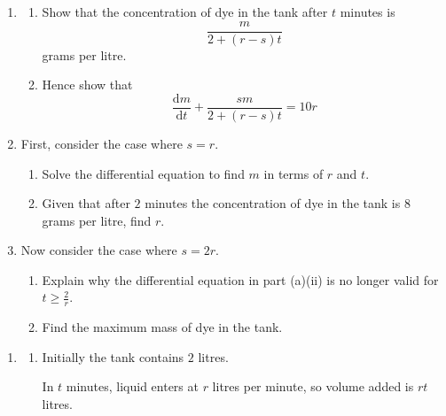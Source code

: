 \documentclass[leqno]{article}
\begin{document}
\begin{enumerate}[
  label=\textbf{\arabic*.},
  leftmargin=*,
  topsep=0pt,
  partopsep=0pt,
  parsep=0pt
]
\begin{enumerate}[label=\textbf{(\alph*)}]
  \item
  \begin{enumerate}[label=(\roman*)]
    \item Show that the concentration of dye in the tank after $t$ minutes is
    \[
    \frac{m}{2+(r-s)t}
    \]
    grams per litre.  \\
    \item Hence show that
    \[
    \frac{\mathrm{d}m}{\mathrm{d}t}+\frac{s m}{2+(r-s)t}=10r
    \]
  \end{enumerate}
  \item First, consider the case where $s=r$. \\
  \begin{enumerate}[label=(\roman*)]
    \item Solve the differential equation to find $m$ in terms of $r$ and $t$.  \\
    \item Given that after $2$ minutes the concentration of dye in the tank is $8$ grams per litre, find $r$.  \\
  \end{enumerate}
  \item Now consider the case where $s=2r$. \\
  \begin{enumerate}[label=(\roman*)]
    \item Explain why the differential equation in part (a)(ii) is no longer valid for $t\geq \frac{2}{r}$.  \\
    \item Find the maximum mass of dye in the tank.  \\
  \end{enumerate}
\end{enumerate}

\vspace*{10pt}

\begin{djsSolution}
\begin{enumerate}[label=\textbf{(\alph*)}]
  \item
  \begin{enumerate}[label=(\roman*)]
    \item Initially the tank contains $2$ litres.

    In $t$ minutes, liquid enters at $r$ litres per minute, so volume added is $rt$ litres.


\end{enumerate}
\end{enumerate}
\end{djsSolution}
\end{enumerate}
\end{document}
